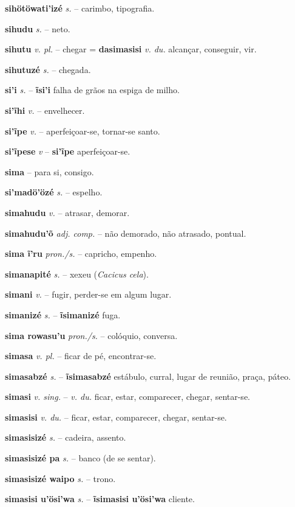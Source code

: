 \textbf{sihötöwati'izé} \textit{s.} -- carimbo, tipografia.

\textbf{sihudu} \textit{s.} -- neto.

\textbf{sihutu} \textit{v. pl.} -- chegar = \textbf{dasimasisi} \textit{v. du.} alcançar, conseguir, vir.

\textbf{sihutuzé} \textit{s.} -- chegada.

\textbf{si'i} \textit{s.} -- \textbf{ĩsi'i} falha de grãos na espiga de milho.

\textbf{si'ĩhi} \textit{v.} -- envelhecer.

\textbf{si'ĩpe} \textit{v.} -- aperfeiçoar-se, tornar-se santo.

\textbf{si'ĩpese} \textit{v} -- \textbf{si'ĩpe} aperfeiçoar-se.

\textbf{sima} -- para si, consigo.

\textbf{si'madö'özé} \textit{s.} -- espelho.

\textbf{simahudu} \textit{v.} -- atrasar, demorar.

\textbf{simahudu'õ} \textit{adj. comp.} -- não demorado, não atrasado, pontual.

\textbf{sima ĩ'ru} \textit{pron./s.} -- capricho, empenho.

\textbf{simanapité} \textit{s.} -- xexeu (\textit{Cacicus cela}).

\textbf{simani} \textit{v.} -- fugir, perder-se em algum lugar.

\textbf{simanizé} \textit{s.} -- \textbf{ĩsimanizé} fuga.

\textbf{sima rowasu'u} \textit{pron./s.} -- colóquio, conversa.

\textbf{simasa} \textit{v. pl.} -- ficar de pé, encontrar-se.

\textbf{simasabzé} \textit{s.} -- \textbf{ĩsimasabzé} estábulo, curral, lugar de reunião, praça, páteo.

\textbf{simasi} \textit{v. sing.} -- \textit{v. du.} ficar, estar, comparecer, chegar, sentar-se.

\textbf{simasisi} \textit{v. du.} -- ficar, estar, comparecer, chegar, sentar-se.

\textbf{simasisizé} \textit{s.} -- cadeira, assento.

\textbf{simasisizé pa} \textit{s.} -- banco (de se sentar).

\textbf{simasisizé waipo} \textit{s.} -- trono.

\textbf{simasisi u'ösi'wa} \textit{s.} -- \textbf{ĩsimasisi u'ösi'wa} cliente.

